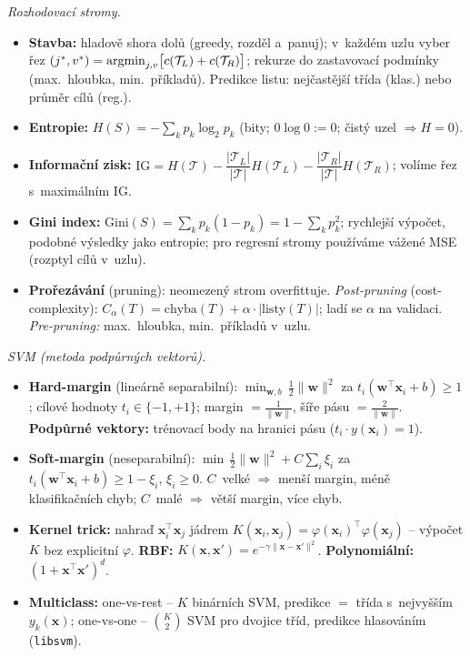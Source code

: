\begin{poznamka}
\smallskip
\emph{Rozhodovací stromy.}
\begin{itemize}
  \item \textbf{Stavba:} hladově shora dolů (greedy, rozděl a~panuj); v~každém uzlu vyber řez $(j^*,v^*)=\operatorname*{argmin}_{j,v}\bigl[c(\mathcal T_L)+c(\mathcal T_R)\bigr]$; rekurze do zastavovací podmínky (max.\ hloubka, min.\ příkladů). Predikce listu: nejčastější třída (klas.) nebo průměr cílů (reg.).
  \item \textbf{Entropie:} $H(S)=-\sum_k p_k\log_2 p_k$ (bity; $0\log0:=0$; čistý uzel $\Rightarrow H=0$).
  \item \textbf{Informační zisk:} $\mathrm{IG}=H(\mathcal T)-\dfrac{|\mathcal T_L|}{|\mathcal T|}H(\mathcal T_L)-\dfrac{|\mathcal T_R|}{|\mathcal T|}H(\mathcal T_R)$; volíme řez s~maximálním $\mathrm{IG}$.
  \item \textbf{Gini index:} $\mathrm{Gini}(S)=\sum_k p_k(1-p_k)=1-\sum_k p_k^2$; rychlejší výpočet, podobné výsledky jako entropie; pro regresní stromy používáme vážené MSE (rozptyl cílů v~uzlu).
  \item \textbf{Prořezávání} (pruning): neomezený strom overfittuje. \emph{Post-pruning} (cost-complexity): $C_\alpha(T)=\text{chyba}(T)+\alpha\cdot|\text{listy}(T)|$; ladí se $\alpha$ na validaci. \emph{Pre-pruning:} max.\ hloubka, min.\ příkladů v~uzlu.
\end{itemize}

\smallskip
\emph{SVM (metoda podpůrných vektorů).}
\begin{itemize}
  \item \textbf{Hard-margin} (lineárně separabilní): $\min_{\mathbf{w},b}\,\tfrac12\|\mathbf{w}\|^2$ za $t_i(\mathbf{w}^\top\mathbf{x}_i+b)\ge1$; cílové hodnoty $t_i\in\{-1,+1\}$; margin $=\tfrac{1}{\|\mathbf{w}\|}$, šíře pásu $=\tfrac{2}{\|\mathbf{w}\|}$. \textbf{Podpůrné vektory:} trénovací body na hranici pásu ($t_i\cdot y(\mathbf{x}_i)=1$).
  \item \textbf{Soft-margin} (neseparabilní): $\min\,\tfrac12\|\mathbf{w}\|^2+C\sum_i\xi_i$ za $t_i(\mathbf{w}^\top\mathbf{x}_i+b)\ge1-\xi_i$, $\xi_i\ge0$. $C$~velké $\Rightarrow$ menší margin, méně klasifikačních chyb; $C$~malé $\Rightarrow$ větší margin, více chyb.
  \item \textbf{Kernel trick:} nahraď $\mathbf{x}_i^\top\mathbf{x}_j$ jádrem $K(\mathbf{x}_i,\mathbf{x}_j)=\varphi(\mathbf{x}_i)^\top\varphi(\mathbf{x}_j)$ -- výpočet $K$ bez explicitní $\varphi$. \textbf{RBF:} $K(\mathbf{x},\mathbf{x}')=e^{-\gamma\|\mathbf{x}-\mathbf{x}'\|^2}$. \textbf{Polynomiální:} $(1+\mathbf{x}^\top\mathbf{x}')^d$.
  \item \textbf{Multiclass:} one-vs-rest -- $K$ binárních SVM, predikce $=$ třída s~nejvyšším $y_k(\mathbf{x})$; one-vs-one -- $\binom{K}{2}$ SVM pro dvojice tříd, predikce hlasováním (\texttt{libsvm}).
\end{itemize}


\end{poznamka}
